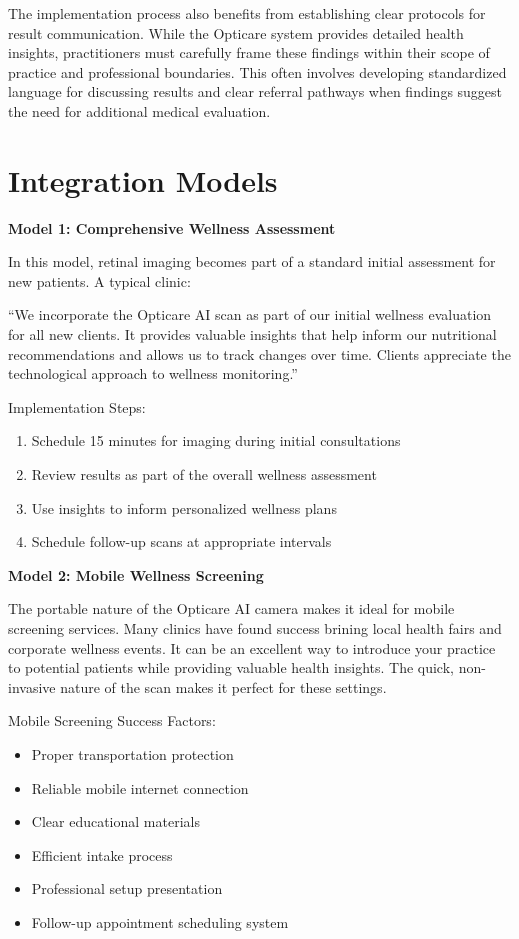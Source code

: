 \documentclass[
  Letterpaper,
]{scrbook}
\providecommand{\tightlist}{%
  \setlength{\itemsep}{0pt}\setlength{\parskip}{0pt}}\usepackage{longtable,booktabs,array}
\begin{document}
The implementation process also benefits from establishing clear
protocols for result communication. While the Opticare system provides
detailed health insights, practitioners must carefully frame these
findings within their scope of practice and professional boundaries.
This often involves developing standardized language for discussing
results and clear referral pathways when findings suggest the need for
additional medical evaluation.

\section{Integration Models}\label{integration-models}

\textbf{Model 1: Comprehensive Wellness Assessment}

In this model, retinal imaging becomes part of a standard initial
assessment for new patients. A typical clinic:

``We incorporate the Opticare AI scan as part of our initial wellness
evaluation for all new clients. It provides valuable insights that help
inform our nutritional recommendations and allows us to track changes
over time. Clients appreciate the technological approach to wellness
monitoring.''

Implementation Steps:

\begin{enumerate}
\def\labelenumi{\arabic{enumi}.}
\tightlist
\item
  Schedule 15 minutes for imaging during initial consultations
\item
  Review results as part of the overall wellness assessment
\item
  Use insights to inform personalized wellness plans
\item
  Schedule follow-up scans at appropriate intervals
\end{enumerate}

\textbf{Model 2: Mobile Wellness Screening}

The portable nature of the Opticare AI camera makes it ideal for mobile
screening services. Many clinics have found success brining local health
fairs and corporate wellness events. It can be an excellent way to
introduce your practice to potential patients while providing valuable
health insights. The quick, non-invasive nature of the scan makes it
perfect for these settings.

Mobile Screening Success Factors:

\begin{itemize}
\tightlist
\item
  Proper transportation protection
\item
  Reliable mobile internet connection
\item
  Clear educational materials
\item
  Efficient intake process
\item
  Professional setup presentation
\item
  Follow-up appointment scheduling system
\end{itemize}
\end{document}

